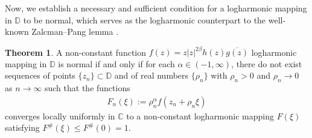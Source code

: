 \documentclass[a4paper,12pt]{amsart}
\theoremstyle{plain}
\theoremstyle{definition}
\newtheorem{thm}{Theorem}[section]
\newcounter {own}
\begin{document}
Now, we establish a necessary and sufficient condition for a logharmonic mapping in  $\mathbb{D}$ to be normal, which serves as the logharmonic counterpart to the well-known Zalcman–Pang lemma \cite{Hua-MM-1995,Pang-Zalcman-BLMS-2000}.
\begin{thm}\label{th-2.2}
A non-constant function $f(z)=z|z|^{2\beta}h(z) \overline{g(z)}$ logharmonic mapping in $\mathbb{D}$ is normal if and only if for each $\alpha\in(-1,\infty)$, there do not exist sequences of points $\{z_n\}\subset\mathbb{D}$ and of real numbers $\{\rho_n\}$ with $\rho_n>0$ and $\rho_n\rightarrow 0$ as $n\rightarrow\infty$ such that the functions 
\begin{align*}
	F_n(\xi):=\rho^{\alpha}_n f(z_n+\rho_n\xi)
\end{align*}
converges locally uniformly in $\mathbb{C}$ to a non-constant logharmonic mapping $F(\xi)$ satisfying $F^{\#}(\xi)\leq F^{\#}(0)= 1$.
\end{thm}
\end{document}
